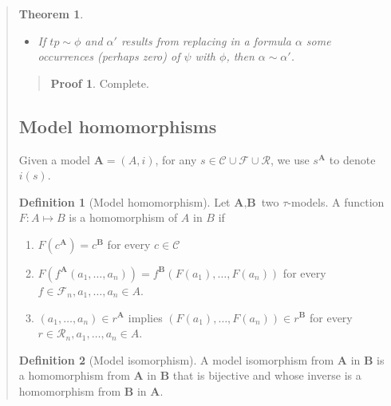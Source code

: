 \documentclass[a4paper, 12pt]{article}
\newtheorem{theorem}{Theorem}
\theoremstyle{definition}
\theoremstyle{definition}
\theoremstyle{definition}
\newtheorem{definition}{Definition}
\newtheorem{pro}{Proof}
\begin{document}
\begin{quote}
\begin{theorem}
\begin{itemize}
        \item If $tp \sim \phi$ and $\alpha'$ results from replacing in a formula $\alpha$
            some occurrences (perhaps zero) of $\psi$ with $\phi$, then 
            $\alpha \sim \alpha'$.
    \end{itemize}
\end{theorem}


\small
\begin{quote}

\begin{pro}
    Complete.
\end{pro}

\end{quote}
\normalsize

\subsection{Model homomorphisms}

Given a model $\textbf{A} = (A, i)$, for any $s \in
\mathcal{C} \cup \mathcal{F} \cup \mathcal{R}$, we use $s^\textbf{A}$ to denote
$i(s)$.

\begin{definition}[Model homomorphism]
    Let $\textbf{A}, \textbf{B}$ two $\tau$-models. A function $F : A \mapsto B$ is a homomorphism 
    of $A$ in $B$ if 

    \begin{enumerate}
        \item $F(c^\textbf{A}) = c^\textbf{B}$ for every $c \in \mathcal{C}$
        \item $F \left( f^\textbf{A} \left( a_1, \ldots, a_n \right)  \right) =
            f^\textbf{B} \left( F(a_1), \ldots, F(a_n) \right) $ for every $f
            \in \mathcal{F}_n, a_1, \ldots, a_n \in A$.
        \item $(a_1, \ldots, a_n) \in r^\textbf{A}$ implies $\left( F(a_1),
            \ldots, F(a_n) \right) \in r^\textbf{B} $ for every $r \in
            \mathcal{R}_n, a_1, \ldots, a_n \in A$.
    \end{enumerate}
\end{definition}

\begin{definition}[Model isomorphism]
    A model isomorphism from $\textbf{A}$ in $\textbf{B}$ is a homomorphism
    from $\textbf{A}$ in $\textbf{B}$ that is bijective and whose inverse is a
    homomorphism from $\textbf{B}$ in $\textbf{A}$.
\end{definition}


\end{quote}
\end{document}
